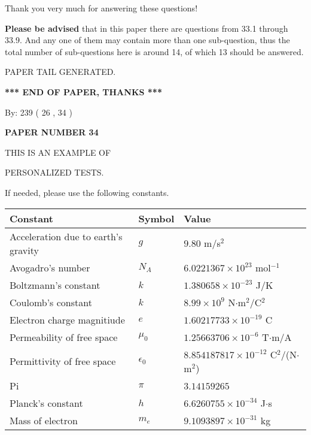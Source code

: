 \documentclass[12pt]{article}
\begin{document}
Thank you very much for answering these questions!
 
{\textbf{\large{Please be advised}}} that in this paper there are questions from
33.1 through
33.9.
And any one of them may contain more than one sub-question, thus the total number
of sub-questions here is around 14, of which
13 should be answered.
 
   
   
\vspace{2.0in} PAPER TAIL GENERATED.
   
   
   
   
\vspace{1.0in} 
{\textbf{\large{ *** END OF PAPER, THANKS *** }}} 
   
   
\hspace{1.0in} By: 
         239 (          26 ,           34 )
   
   
   
   
\newpage 
\setcounter{page}{ 
    34001 } 
   
   
   
   
 {\textbf{ \Large{ PAPER NUMBER           34  }}}
   
   
\vspace{0.2in}
   
   
   
   
   
   
   
   
 \vspace{0.2in}
 
 
{\Huge  THIS IS AN EXAMPLE OF}
 
{\Huge  PERSONALIZED TESTS. }
 
If needed, please use the following constants.
 
 
 
\noindent\begin{tabular}{|l|l|l|}
\hline
Constant & Symbol & Value \\
\hline
Acceleration due to earth's gravity &
$g$ &
 $ 9.80 $
m/s$^2$ \\
\hline
Avogadro's number &
$N_A$ &
 $ 6.0221367 \times 10^{23} $
mol$^{-1}$ \\
\hline
Boltzmann's constant &
$k$ &
 $ 1.380658 \times 10^{-23} $
J/K \\
\hline
Coulomb's constant &
$k$ &
 $ 8.99 \times 10^{9} $
N$\cdot $m$^2$/C$^2$ \\
\hline
Electron charge magnitiude &
$e$ &
 $ 1.60217733 \times 10^{-19} $
C \\
\hline
Permeability of free space &
$\mu _0$ &
 $ 1.25663706 \times 10^{-6} $
T$\cdot $m/A \\
\hline
Permittivity of free space &
$\epsilon _0$ &
 $ 8.854187817 \times 10^{-12} $
C$^2$/(N$\cdot $m$^2$) \\
\hline
Pi &
$\pi$ &
 $ 3.14159265 $
$ $ \\
\hline
Planck's constant &
$h$ &
 $ 6.6260755 \times 10^{-34} $
J$\cdot $s \\
\hline
Mass of electron &
$m_e$ &
 $ 9.1093897 \times 10^{-31} $
kg \\
\hline
\end{tabular}
 
\end{document}
